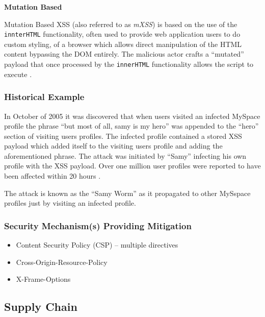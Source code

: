\documentclass{mscreport}
\begin{document}
\vspace{0.6cm} \noindent
\textbf{Mutation Based}

\vspace{0.2cm} \noindent
Mutation Based XSS (also referred to as \textit{mXSS}) is based on the use of the \texttt{innterHTML} functionality, often used to provide web application users to do custom styling, of a browser which allows direct manipulation of the HTML content bypassing the DOM entirely. The malicious actor crafts a ``mutated'' payload that once processed by the \texttt{innerHTML} functionality allows the script to execute \cite{Heiderich2013-qv}.

\subsubsection{Historical Example}
In October of 2005 it was discovered that when users visited an infected MySpace profile the phrase ``but most of all, samy is my hero'' was appended to the ``hero'' section of visiting users profiles. The infected profile contained a stored XSS payload which added itself to the visiting users profile and adding the aforementioned phrase. The attack was initiated by ``Samy'' infecting his own profile with the XSS payload. Over one million user profiles were reported to have been affected within 20 hours \cite{Lee2019-xf}.

\vspace{0.2cm} \noindent
The attack is known as the ``Samy Worm'' as it propagated to other MySspace profiles just by visiting an infected profile.

\subsubsection{Security Mechanism(s) Providing Mitigation}

\begin{itemize}
	\setlength\itemsep{0.1em}
	\item Content Security Policy (CSP) – multiple directives
	\item Cross-Origin-Resource-Policy
	\item X-Frame-Options
\end{itemize}


\subsection{Supply Chain}
\label{subsection:SupplyChain}
\end{document}
